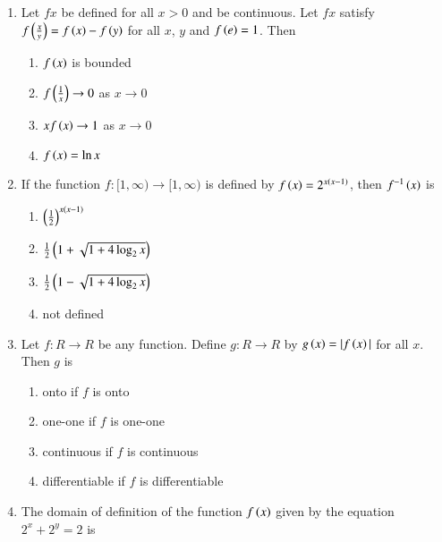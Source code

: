 \documentclass[journal,12pt,twocolumn]{IEEEtran}
\theoremstyle{remark}
\begin{document}
\begin{enumerate}
\item Let $f{x}$ be defined for all $x>0$ and be continuous. Let $f{x}$ satisfy $f\left(\frac{x}{y}\right)=f\left(x\right)-f\left(y\right)$ for all $x$, $y$ and $f\left(e\right)=1$. Then

\hfill{}

\begin{multicols}{2}
	\begin{enumerate}
		\item $f\left(x\right)$ is bounded 
		\item $f\left(\frac{1}{x}\right)\to0$ as $x\to0$
		\item $xf\left(x\right)\to1$ as $x\to0$ 
		\item $f\left(x\right)=\ln{x}$
	\end{enumerate}
\end{multicols}

\item If the function $f:[1,\infty)\to[1,\infty)$ is defined by $f\left(x\right)=2^{x\left(x-1\right)}$, then $f^{-1}\left(x\right)$ is

\hfill{}

\begin{multicols}{2}
	\begin{enumerate}
		\item $\left(\frac{1}{2}\right)^{x\left(x-1\right)}$ 
		\item $\frac{1}{2}\left(1+\sqrt{1+4\log_{2}{x}}\right)$
		\item $\frac{1}{2}\left(1-\sqrt{1+4\log_{2}{x}}\right)$ 
		\item not defined
	\end{enumerate}
\end{multicols}

\item Let $f:R\to R$ be any function. Define $g:R\to R$ by $g\left(x\right)=|f\left(x\right)|$ for all $x$. Then $g$ is

\hfill{}

\begin{enumerate}
\item onto if $f$ is onto
\item one-one if $f$ is one-one
\item continuous if $f$ is continuous
\item differentiable if $f$ is differentiable
\end{enumerate}

\item The domain of definition of the function $f\left(x\right)$ given by the equation $2^{x}+2^{y}=2$ is


\end{enumerate}
\end{document}
